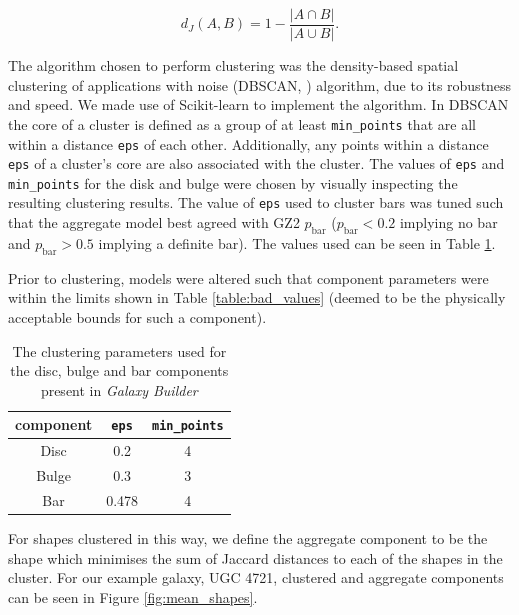 \documentclass[../main.tex]{subfiles}
\begin{document}
\begin{equation}
d_J(A, B) = 1 - \frac{|A \cap B|}{|A \cup B|}.
\end{equation}

The algorithm chosen to perform clustering was the density-based spatial clustering of applications with noise (DBSCAN, \citealt{dbscan}) algorithm, due to its robustness and speed. We made use of Scikit-learn \citep{scikit-learn} to implement the algorithm. In DBSCAN the core of a cluster is defined as a group of at least \texttt{min\_points} that are all within a distance \texttt{eps} of each other. Additionally, any points within a distance \texttt{eps} of a cluster's core are also associated with the cluster.
The values of \texttt{eps} and \texttt{min\_points} for the disk and bulge were chosen by visually inspecting the resulting clustering results. The value of \texttt{eps} used to cluster bars was tuned such that the aggregate model best agreed with GZ2 $p_\mathrm{bar}$ ($p_\mathrm{bar} < 0.2$ implying no bar and $p_\mathrm{bar} > 0.5$ implying a definite bar). The values used can be seen in Table \ref{table:dbscan_params}.

Prior to clustering, models were altered such that component parameters were within the limits shown in Table \ref{table:bad_values} (deemed to be the physically acceptable bounds for such a component).

\begin{table}
  \centering
  \caption{The clustering parameters used for the disc, bulge and bar components present in \textit{Galaxy Builder}}
  \begin{tabular}{ |c|c|c| }
    \hline
    component & \texttt{eps} & \texttt{min\_points} \\
    \hline
    Disc & 0.2 & 4 \\
    Bulge & 0.3 & 3 \\
    Bar & 0.478 & 4 \\
    \hline
  \end{tabular}
  \label{table:dbscan_params}
\end{table}

For shapes clustered in this way, we define the aggregate component to be the shape which minimises the sum of Jaccard distances to each of the shapes in the cluster. For our example galaxy, UGC 4721, clustered and aggregate components can be seen in Figure \ref{fig:mean_shapes}.
\end{document}
